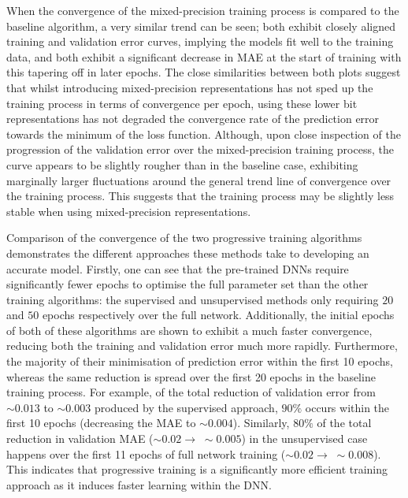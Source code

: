 \documentclass[a4paper, 11pt]{report}
\begin{document}
    When the convergence of the mixed-precision training process is compared to the baseline algorithm, a very similar trend can be seen; both exhibit closely aligned training and validation error curves, implying the models fit well to the training data, and both exhibit a significant decrease in MAE at the start of training with this tapering off in later epochs. The close similarities between both plots suggest that whilst introducing mixed-precision representations has not sped up the training process in terms of convergence per epoch, using these lower bit representations has not degraded the convergence rate of the prediction error towards the minimum of the loss function. Although, upon close inspection of the progression of the validation error over the mixed-precision training process, the curve appears to be slightly rougher than in the baseline case, exhibiting marginally larger fluctuations around the general trend line of convergence over the training process. This suggests that the training process may be slightly less stable when using mixed-precision representations.

    Comparison of the convergence of the two progressive training algorithms demonstrates the different approaches these methods take to developing an accurate model. Firstly, one can see that the pre-trained DNNs require significantly fewer epochs to optimise the full parameter set than the other training algorithms: the supervised and unsupervised methods only requiring $20$ and $50$ epochs respectively over the full network. Additionally, the initial epochs of both of these algorithms are shown to exhibit a much faster convergence, reducing both the training and validation error much more rapidly. Furthermore, the majority of their minimisation of prediction error within the first 10 epochs, whereas the same reduction is spread over the first 20 epochs in the baseline training process. For example, of the total reduction of validation error from $\sim \! 0.013$ to $\sim \! 0.003$ produced by the supervised approach, $90\%$ occurs within the first 10 epochs (decreasing the MAE to $\sim \! 0.004$). Similarly, $80\%$ of the total reduction in validation MAE ($\sim \! 0.02 \to \; \sim \! 0.005$) in the unsupervised case happens over the first 11 epochs of full network training ($\sim \! 0.02 \to \; \sim \! 0.008$). This indicates that progressive training is a significantly more efficient training approach as it induces faster learning within the DNN.
\end{document}
